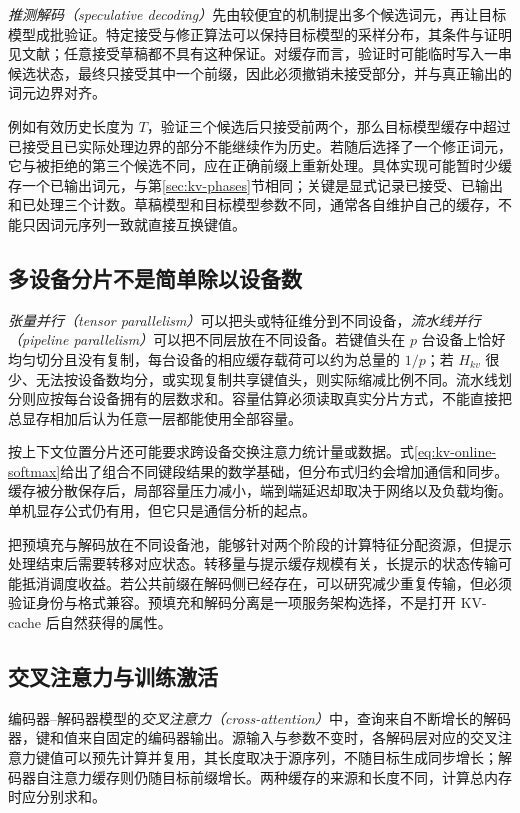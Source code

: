 \documentclass[UTF8,12pt,a4paper,fontset=fandol]{ctexart}
\begin{document}
\emph{推测解码（speculative decoding）}先由较便宜的机制提出多个候选词元，再让目标模型成批验证。特定接受与修正算法可以保持目标模型的采样分布，其条件与证明见文献\cite{speculative}；任意接受草稿都不具有这种保证。对缓存而言，验证时可能临时写入一串候选状态，最终只接受其中一个前缀，因此必须撤销未接受部分，并与真正输出的词元边界对齐。

例如有效历史长度为 $T$，验证三个候选后只接受前两个，那么目标模型缓存中超过已接受且已实际处理边界的部分不能继续作为历史。若随后选择了一个修正词元，它与被拒绝的第三个候选不同，应在正确前缀上重新处理。具体实现可能暂时少缓存一个已输出词元，与第\ref{sec:kv-phases}节相同；关键是显式记录已接受、已输出和已处理三个计数。草稿模型和目标模型参数不同，通常各自维护自己的缓存，不能只因词元序列一致就直接互换键值。

\subsection{多设备分片不是简单除以设备数}

\emph{张量并行（tensor parallelism）}可以把头或特征维分到不同设备，\emph{流水线并行（pipeline parallelism）}可以把不同层放在不同设备。若键值头在 $p$ 台设备上恰好均匀切分且没有复制，每台设备的相应缓存载荷可以约为总量的 $1/p$；若 $H_{kv}$ 很少、无法按设备数均分，或实现复制共享键值头，则实际缩减比例不同。流水线划分则应按每台设备拥有的层数求和。容量估算必须读取真实分片方式，不能直接把总显存相加后认为任意一层都能使用全部容量。

按上下文位置分片还可能要求跨设备交换注意力统计量或数据。式\eqref{eq:kv-online-softmax}给出了组合不同键段结果的数学基础，但分布式归约会增加通信和同步。缓存被分散保存后，局部容量压力减小，端到端延迟却取决于网络以及负载均衡。单机显存公式仍有用，但它只是通信分析的起点。

把预填充与解码放在不同设备池，能够针对两个阶段的计算特征分配资源，但提示处理结束后需要转移对应状态。转移量与提示缓存规模有关，长提示的状态传输可能抵消调度收益。若公共前缀在解码侧已经存在，可以研究减少重复传输，但必须验证身份与格式兼容。预填充和解码分离是一项服务架构选择，不是打开 KV-cache 后自然获得的属性。

\subsection{交叉注意力与训练激活}

编码器--解码器模型的\emph{交叉注意力（cross-attention）}中，查询来自不断增长的解码器，键和值来自固定的编码器输出。源输入与参数不变时，各解码层对应的交叉注意力键值可以预先计算并复用，其长度取决于源序列，不随目标生成同步增长；解码器自注意力缓存则仍随目标前缀增长。两种缓存的来源和长度不同，计算总内存时应分别求和。
\end{document}
